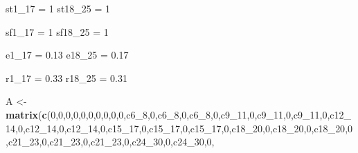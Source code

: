 \documentclass[]{article}
\newenvironment{Shaded}{\begin{snugshade}}{\end{snugshade}}
\newcommand{\DecValTok}[1]{\textcolor[rgb]{0.00,0.00,0.81}{#1}}
\newcommand{\FloatTok}[1]{\textcolor[rgb]{0.00,0.00,0.81}{#1}}
\newcommand{\KeywordTok}[1]{\textcolor[rgb]{0.13,0.29,0.53}{\textbf{#1}}}
\newcommand{\NormalTok}[1]{#1}
\newcommand{\StringTok}[1]{\textcolor[rgb]{0.31,0.60,0.02}{#1}}
\begin{document}
\begin{Shaded}
\begin{Highlighting}[]
\NormalTok{st1_}\DecValTok{17}\NormalTok{ =}\StringTok{ }\DecValTok{1}
\NormalTok{st18_}\DecValTok{25}\NormalTok{ =}\StringTok{ }\DecValTok{1}

\NormalTok{sf1_}\DecValTok{17}\NormalTok{ =}\StringTok{ }\DecValTok{1}
\NormalTok{sf18_}\DecValTok{25}\NormalTok{ =}\StringTok{ }\DecValTok{1}

\NormalTok{e1_}\DecValTok{17}\NormalTok{ =}\StringTok{ }\FloatTok{0.13}
\NormalTok{e18_}\DecValTok{25}\NormalTok{ =}\StringTok{ }\FloatTok{0.17}

\NormalTok{r1_}\DecValTok{17}\NormalTok{ =}\StringTok{ }\FloatTok{0.33}
\NormalTok{r18_}\DecValTok{25}\NormalTok{ =}\StringTok{ }\FloatTok{0.31}

\NormalTok{A <-}\StringTok{ }\KeywordTok{matrix}\NormalTok{(}\KeywordTok{c}\NormalTok{(}\DecValTok{0}\NormalTok{,}\DecValTok{0}\NormalTok{,}\DecValTok{0}\NormalTok{,}\DecValTok{0}\NormalTok{,}\DecValTok{0}\NormalTok{,}\DecValTok{0}\NormalTok{,}\DecValTok{0}\NormalTok{,}\DecValTok{0}\NormalTok{,}\DecValTok{0}\NormalTok{,}\DecValTok{0}\NormalTok{,c6_}\DecValTok{8}\NormalTok{,}\DecValTok{0}\NormalTok{,c6_}\DecValTok{8}\NormalTok{,}\DecValTok{0}\NormalTok{,c6_}\DecValTok{8}\NormalTok{,}\DecValTok{0}\NormalTok{,c9_}\DecValTok{11}\NormalTok{,}\DecValTok{0}\NormalTok{,c9_}\DecValTok{11}\NormalTok{,}\DecValTok{0}\NormalTok{,c9_}\DecValTok{11}\NormalTok{,}\DecValTok{0}\NormalTok{,c12_}\DecValTok{14}\NormalTok{,}\DecValTok{0}\NormalTok{,c12_}\DecValTok{14}\NormalTok{,}\DecValTok{0}\NormalTok{,c12_}\DecValTok{14}\NormalTok{,}\DecValTok{0}\NormalTok{,c15_}\DecValTok{17}\NormalTok{,}\DecValTok{0}\NormalTok{,c15_}\DecValTok{17}\NormalTok{,}\DecValTok{0}\NormalTok{,c15_}\DecValTok{17}\NormalTok{,}\DecValTok{0}\NormalTok{,c18_}\DecValTok{20}\NormalTok{,}\DecValTok{0}\NormalTok{,c18_}\DecValTok{20}\NormalTok{,}\DecValTok{0}\NormalTok{,c18_}\DecValTok{20}\NormalTok{,}\DecValTok{0}\NormalTok{,c21_}\DecValTok{23}\NormalTok{,}\DecValTok{0}\NormalTok{,c21_}\DecValTok{23}\NormalTok{,}\DecValTok{0}\NormalTok{,c21_}\DecValTok{23}\NormalTok{,}\DecValTok{0}\NormalTok{,c24_}\DecValTok{30}\NormalTok{,}\DecValTok{0}\NormalTok{,c24_}\DecValTok{30}\NormalTok{,}\DecValTok{0}\NormalTok{,}

\end{Highlighting}
\end{Shaded}
\end{document}
